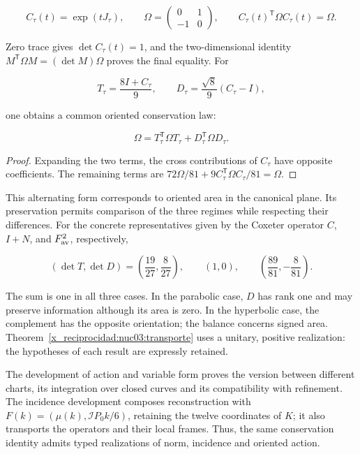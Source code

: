 \[
C_\tau(t)=\exp(tJ_\tau),\qquad
\Omega=\begin{pmatrix}0&1\\-1&0\end{pmatrix},\qquad
C_\tau(t)^\mathsf T\Omega C_\tau(t)=\Omega.
\]

Zero trace gives \(\det C_\tau(t)=1\), and the two-dimensional identity \(M^\mathsf T\Omega M=(\det M)\Omega\) proves the final equality. For

\[
T_\tau=\frac{8I+C_\tau}{9},\qquad
D_\tau=\frac{\sqrt8}{9}(C_\tau-I),
\]

one obtains a common oriented conservation law:

\begin{equation}
\boxed{\Omega=T_\tau^\mathsf T\Omega T_\tau+D_\tau^\mathsf T\Omega D_\tau.}
\label{x_reciprocidad:nuc03:eq:22}
\end{equation}

\begin{proof}
Expanding the two terms, the cross contributions of \(C_\tau\) have opposite coefficients. The remaining terms are \(72\Omega/81+9C_\tau^\mathsf T\Omega C_\tau/81=\Omega\).
\end{proof}

This alternating form corresponds to oriented area in the canonical plane. Its preservation permits comparison of the three regimes while respecting their differences. For the concrete representatives given by the Coxeter operator \(C\), \(I+N\), and \(F_{\rm av}^2\), respectively,

\begin{equation}
(\det T,\det D)=
\left(\frac{19}{27},\frac8{27}\right),\qquad
(1,0),\qquad
\left(\frac{89}{81},-\frac8{81}\right).
\label{x_reciprocidad:nuc03:eq:23}
\end{equation}

The sum is one in all three cases. In the parabolic case, \(D\) has rank one and may preserve information although its area is zero. In the hyperbolic case, the complement has the opposite orientation; the balance concerns signed area. Theorem~\ref{x_reciprocidad:nuc03:transporte} uses a unitary, positive realization: the hypotheses of each result are expressly retained.

The development of action and variable form proves the version between different charts, its integration over closed curves and its compatibility with refinement. The incidence development composes reconstruction with \(F(k)=(\mu(k),\mathcal I P_0k/6)\), retaining the twelve coordinates of \(K\); it also transports the operators and their local frames. Thus, the same conservation identity admits typed realizations of norm, incidence and oriented action.
